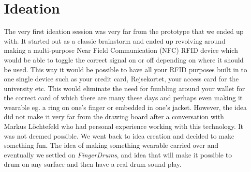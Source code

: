 \chapter{Ideation}
\label{Ideation}
The very first ideation session was very far from the prototype that we ended up with. It started out as a classic brainstorm and ended up revolving around making a multi-purpose Near Field Communication (NFC) RFID device which would be able to toggle the correct signal on or off depending on where it should be used. This way it would be possible to have all your RFID purposes built in to one single device such as your credit card, Rejsekortet, your access card for the university etc. This would eliminate the need for fumbling around your wallet for the correct card of which there are many these days and perhaps even making it wearable eg. a ring on one's finger or embedded in one's jacket. However, the idea did not make it very far from the drawing board after a conversation with Markus Löchtefeld who had personal experience working with this technology. It was not deemed possible. We went back to idea creation and decided to make something fun. The idea of making something wearable carried over and eventually we settled on \textit{FingerDrums}, and idea that will make it possible to drum on any surface and then have a real drum sound play. 




